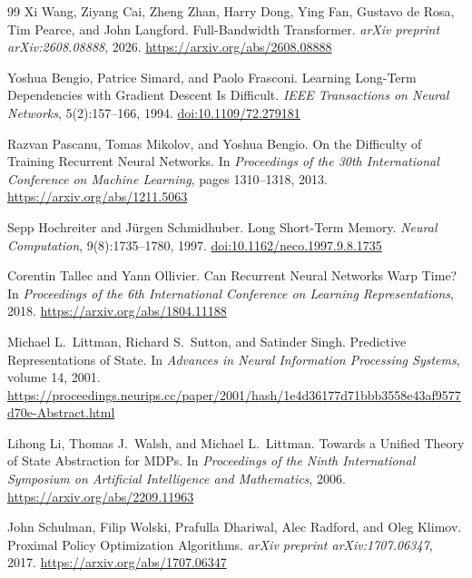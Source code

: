 \documentclass[11pt]{article}
\begin{document}
\begin{thebibliography}{99}
Xi Wang, Ziyang Cai, Zheng Zhan, Harry Dong, Ying Fan,
Gustavo de Rosa, Tim Pearce, and John Langford.
\newblock Full-Bandwidth Transformer.
\newblock \textit{arXiv preprint arXiv:2608.08888}, 2026.
\newblock \url{https://arxiv.org/abs/2608.08888}

Yoshua Bengio, Patrice Simard, and Paolo Frasconi.
\newblock Learning Long-Term Dependencies with Gradient Descent
Is Difficult.
\newblock \textit{IEEE Transactions on Neural Networks},
5(2):157--166, 1994.
\newblock \href{https://doi.org/10.1109/72.279181}
{doi:10.1109/72.279181}

Razvan Pascanu, Tomas Mikolov, and Yoshua Bengio.
\newblock On the Difficulty of Training Recurrent Neural Networks.
\newblock In \textit{Proceedings of the 30th International Conference
on Machine Learning}, pages 1310--1318, 2013.
\newblock \url{https://arxiv.org/abs/1211.5063}

Sepp Hochreiter and J\"urgen Schmidhuber.
\newblock Long Short-Term Memory.
\newblock \textit{Neural Computation}, 9(8):1735--1780, 1997.
\newblock \href{https://doi.org/10.1162/neco.1997.9.8.1735}
{doi:10.1162/neco.1997.9.8.1735}

Corentin Tallec and Yann Ollivier.
\newblock Can Recurrent Neural Networks Warp Time?
\newblock In \textit{Proceedings of the 6th International Conference
on Learning Representations}, 2018.
\newblock \url{https://arxiv.org/abs/1804.11188}

Michael L.\ Littman, Richard S.\ Sutton, and Satinder Singh.
\newblock Predictive Representations of State.
\newblock In \textit{Advances in Neural Information Processing Systems},
volume 14, 2001.
\newblock \url{https://proceedings.neurips.cc/paper/2001/hash/1e4d36177d71bbb3558e43af9577d70e-Abstract.html}

Lihong Li, Thomas J.\ Walsh, and Michael L.\ Littman.
\newblock Towards a Unified Theory of State Abstraction for MDPs.
\newblock In \textit{Proceedings of the Ninth International Symposium
on Artificial Intelligence and Mathematics}, 2006.
\newblock \url{https://arxiv.org/abs/2209.11963}

John Schulman, Filip Wolski, Prafulla Dhariwal, Alec Radford, and
Oleg Klimov.
\newblock Proximal Policy Optimization Algorithms.
\newblock \textit{arXiv preprint arXiv:1707.06347}, 2017.
\newblock \url{https://arxiv.org/abs/1707.06347}


\end{thebibliography}
\end{document}
